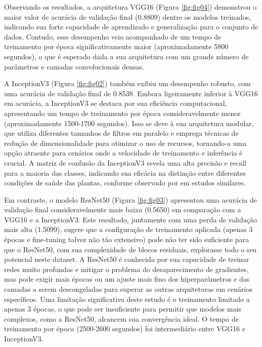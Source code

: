 \documentclass[12pt]{article}
\begin{document}
Observando os resultados, a arquitetura VGG16 (Figura \ref{fig:fig04}) demonstrou o maior valor de acurácia de validação final (0.8809) dentre os modelos treinados, indicando sua forte capacidade de aprendizado e generalização para o conjunto de dados. Contudo, esse desempenho veio acompanhado de um tempo de treinamento por época significativamente maior (aproximadamente 5800 segundos), o que é esperado dada a sua arquitetura com um grande número de parâmetros e camadas convolucionais densas. 

A InceptionV3 (Figura \ref{fig:fig02}) também exibiu um desempenho robusto, com uma acurácia de validação final de 0.8538. Embora ligeiramente inferior à VGG16 em acurácia, a InceptionV3 se destaca por sua eficiência computacional, apresentando um tempo de treinamento por época consideravelmente menor (aproximadamente 1500-1700 segundos). Isso se deve à sua arquitetura modular, que utiliza diferentes tamanhos de filtros em paralelo e emprega técnicas de redução de dimensionalidade para otimizar o uso de recursos, tornando-a uma opção atraente para cenários onde a velocidade de treinamento e inferência é crucial. A matriz de confusão da InceptionV3 revela uma alta precisão e recall para a maioria das classes, indicando sua eficácia na distinção entre diferentes condições de saúde das plantas, conforme observado por \cite{mohanty2016deep} em estudos similares. 

Em contraste, o modelo ResNet50 (Figura \ref{fig:fig03}) apresentou uma acurácia de validação final consideravelmente mais baixa (0.5650) em comparação com a VGG16 e a InceptionV3. Este resultado, juntamente com uma perda de validação mais alta (1.5099), sugere que a configuração de treinamento aplicada (apenas 3 épocas e fine-tuning talvez não tão extensivo) pode não ter sido suficiente para que o ResNet50, com sua complexidade de blocos residuais, explorasse todo o seu potencial neste dataset. A ResNet50 é conhecida por sua capacidade de treinar redes muito profundas e mitigar o problema do desaparecimento de gradientes, mas pode exigir mais épocas ou um ajuste mais fino dos hiperparâmetros e das camadas a serem descongeladas para superar as outras arquiteturas em cenários específicos. Uma limitação significativa deste estudo é o treinamento limitado a apenas 3 épocas, o que pode ser insuficiente para permitir que modelos mais complexos, como a ResNet50, alcancem sua convergência ideal. O tempo de treinamento por época (2500-2600 segundos) foi intermediário entre VGG16 e InceptionV3. 
\end{document}
